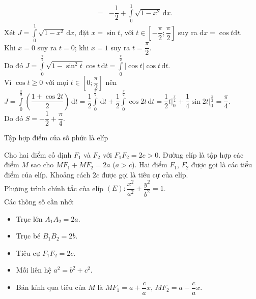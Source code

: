 \begin{ex}
{\begin{eqnarray*}
			&=& - \dfrac{1}{2} + \displaystyle\int\limits_{0}^{1}\sqrt{1 -  x^2}\, \mathrm{d}x.
		\end{eqnarray*}
		Xét $J =  \displaystyle\int\limits_{0}^{1}\sqrt{1 -  x^2}\, \mathrm{d}x$, đặt $x = \sin t$, với $t\in\left[-\dfrac{\pi}{2};\dfrac{\pi}{2}\right]$ suy ra $\mathrm{d}x = \cos t\mathrm{d}t$.\\
		Khi $x = 0$ suy ra $t = 0$; khi $x = 1$ suy ra $t = \dfrac{\pi}{2}$.\\
		Do đó $J =  \displaystyle\int\limits_{0}^{\tfrac{\pi}{2}}\sqrt{1 -  \sin^2t}\cos t\, \mathrm{d}t =  \displaystyle\int\limits_{0}^{\tfrac{\pi}{2}}\left\vert\cos t \right\vert\cos t\, \mathrm{d}t$.\\
		Vì $\cos t\geq 0$ với mọi $t\in\left[0;\dfrac{\pi}{2}\right]$ nên\\
		$J = \displaystyle\int\limits_{0}^{\tfrac{\pi}{2}}\left(\dfrac{1 + \cos 2t}{2}\right)\, \mathrm{d}t =  \dfrac{1}{2}\displaystyle\int\limits_{0}^{\tfrac{\pi}{2}}\, \mathrm{d}t +  \dfrac{1}{2}\displaystyle\int\limits_{0}^{\tfrac{\pi}{2}}\cos 2t\, \mathrm{d}t =  \dfrac{1}{2}t\bigg\vert_{0}^{\tfrac{\pi}{2}}+  \dfrac{1}{4}\sin 2t\bigg\vert_{0}^{\tfrac{\pi}{2}} = \dfrac{\pi}{4}$.\\
		Do đó $S = - \dfrac{1}{2} + \dfrac{\pi}{4}$.
	}
\end{ex}

\begin{dang}{Tập hợp điểm của số phức là elíp}
\begin{dn} Cho hai điểm cố định $F_{1}$ và $F_{2}$ với $F_{1}F_{2} = 2c > 0$. Đường elíp là tập hợp các điểm $M$ sao cho $MF_{1} + MF_{2} = 2a$ ($a > c$). Hai điểm $F_{1}$, $F_{2}$ được gọi là các tiểu điểm của elíp. Khoảng cách $2c$ được gọi là tiêu cự của elíp.\\
		Phương trình chính tắc của elíp $\left(E\right)\colon \dfrac{x^2}{a^2} + \dfrac{y^2}{b^2} = 1$.\\
		Các thông số cần nhớ:
	\end{dn}
	\begin{note}
		\begin{itemize}  
			\item Trục lớn  $A_1A_2 = 2a$.
			\item Trục bé  $B_1B_2 = 2b$.
			\item  Tiêu cự  $F_1F_2 = 2c$.
			\item Mối liên hệ $a^2 = b^2 + c^2$.
			\item  Bán kính qua tiêu của $M$ là $MF_{1} = a + \dfrac{c}{a}x$, $MF_{2} = a - \dfrac{c}{a}x$.
		\end{itemize}
	\end{note}
\end{dang}

